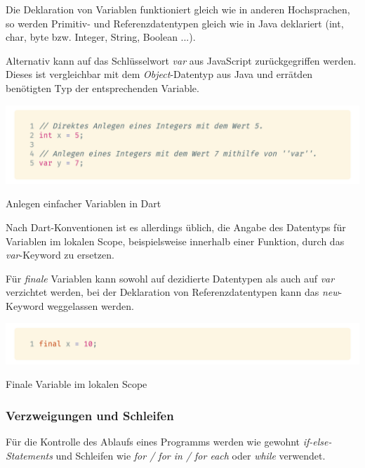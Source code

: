 Die Deklaration von Variablen funktioniert gleich wie in anderen Hochsprachen, so werden Primitiv- und Referenzdatentypen gleich wie in Java deklariert (int, char, byte bzw. Integer, String, Boolean ...).

Alternativ kann auf das Schlüsselwort \textit{var} aus JavaScript zurückgegriffen werden. Dieses ist vergleichbar mit dem \textit{Object}-Datentyp aus Java und \glqq errät\grqq\space den benötigten Typ der entsprechenden Variable.

\begin{code}[h]
    \centering
    \includegraphics[width=1\textwidth]{images/Dart/theory/dartVariables.png}
    \vspace{-25pt}
    \caption{Anlegen einfacher Variablen in Dart}
\end{code}

Nach Dart-Konventionen ist es allerdings üblich, die Angabe des Datentyps für Variablen im lokalen Scope, beispielsweise innerhalb einer Funktion, durch das \textit{var}-Keyword zu ersetzen. \cite{dartdesignvariables2021}

Für \textit{finale} Variablen kann sowohl auf dezidierte Datentypen als auch auf \textit{var} verzichtet werden, bei der Deklaration von Referenzdatentypen kann das \textit{new}-Keyword 
weggelassen werden.

\begin{code}[h]
    \centering
    \includegraphics[width=1\textwidth]{images/Dart/theory/dartLocalFinal.png}
    \vspace{-25pt}
    \caption{Finale Variable im lokalen Scope}
\end{code}

\subsubsection{Verzweigungen und Schleifen}

Für die Kontrolle des Ablaufs eines Programms werden wie gewohnt \textit{if-else-Statements} und Schleifen
wie \textit{for / for in / for each} oder \textit{while} verwendet.


